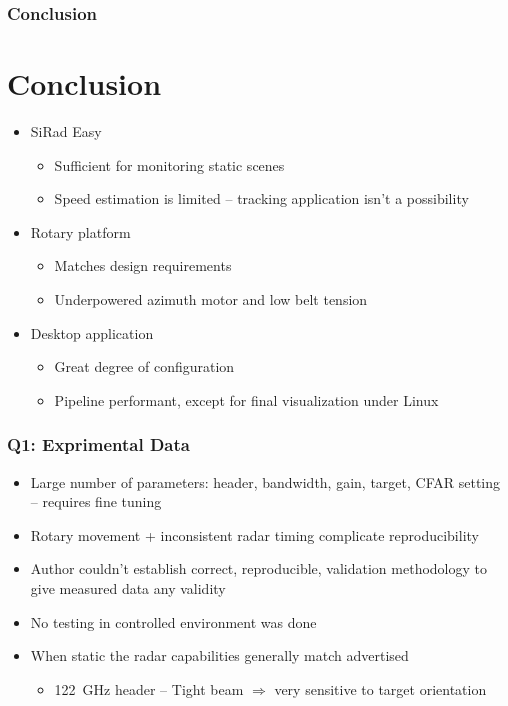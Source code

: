 \documentclass[aspectratio=169]{beamer}
\begin{document}
\begin{frame}[fragile]
  \frametitle{Conclusion}
  \section{Conclusion}
  \begin{itemize}
    \item SiRad Easy
      \begin{itemize}
				\item Sufficient for monitoring static scenes
        \item Speed estimation is limited -- tracking application isn't a possibility
      \end{itemize}
    \item Rotary platform
      \begin{itemize}
        \item Matches design requirements
        \item Underpowered azimuth motor and low belt tension
      \end{itemize}
    \item Desktop application
      \begin{itemize}
        \item Great degree of configuration
        \item Pipeline performant, except for final visualization under Linux
      \end{itemize}
  \end{itemize}
\end{frame}



\begin{frame}[fragile]
  \frametitle{Q1: Exprimental Data}

  \begin{itemize}
    \item Large number of parameters: header, bandwidth, gain, target, CFAR setting -- requires fine tuning
    \item Rotary movement + inconsistent radar timing complicate reproducibility
    \item Author couldn't establish correct, reproducible, validation methodology to give measured data any validity
    \item No testing in controlled environment was done
    \item When static the radar capabilities generally match advertised
      \begin{itemize}
        \item 122~GHz header -- Tight beam $\Rightarrow$ very sensitive to target orientation
      \end{itemize}
  \end{itemize}
\end{frame}
\end{document}
